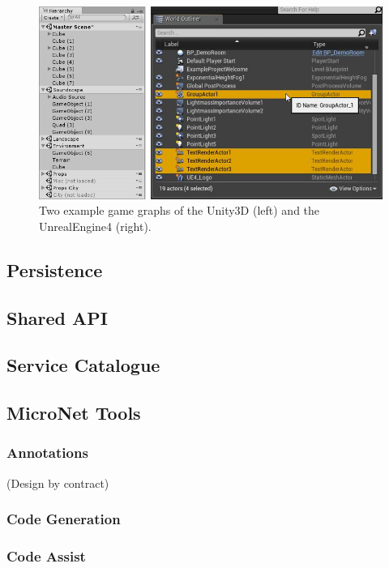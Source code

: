 \begin{figure}
  \centering
  \includegraphics[width=\textwidth]{images/game_engine/scenegraph}
  \caption{Two example game graphs of the Unity3D (left) and the UnrealEngine4
  (right).}
  \label{fig:scenegraph}
\end{figure}

\subsection{Persistence}

\subsection{Shared API}

\subsection{Service Catalogue}







\subsection{MicroNet Tools}

\subsubsection{Annotations}
 (Design by contract)
 

\subsubsection{Code Generation}

\subsubsection{Code Assist}

